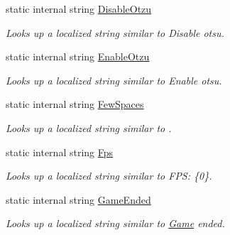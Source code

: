 \begin{DoxyCompactItemize}
static internal string \mbox{\hyperlink{class_chess_tracking_1_1_localization_1_1_program_localization_a1cf78f818c7e6499ec13270f42d75c0f}{Disable\+Otzu}}
\begin{DoxyCompactList}\small\item\em Looks up a localized string similar to Disable otsu. \end{DoxyCompactList}\item 
static internal string \mbox{\hyperlink{class_chess_tracking_1_1_localization_1_1_program_localization_a27f55e0053e8868dcd7c0e312cfb6003}{Enable\+Otzu}}
\begin{DoxyCompactList}\small\item\em Looks up a localized string similar to Enable otsu. \end{DoxyCompactList}\item 
static internal string \mbox{\hyperlink{class_chess_tracking_1_1_localization_1_1_program_localization_adfbd0d8334f47cf985747779e031db13}{Few\+Spaces}}
\begin{DoxyCompactList}\small\item\em Looks up a localized string similar to . \end{DoxyCompactList}\item 
static internal string \mbox{\hyperlink{class_chess_tracking_1_1_localization_1_1_program_localization_aee5a74e01e15fd81e9f4a9e2bf55d9b9}{Fps}}
\begin{DoxyCompactList}\small\item\em Looks up a localized string similar to F\+PS\+: \{0\}. \end{DoxyCompactList}\item 
static internal string \mbox{\hyperlink{class_chess_tracking_1_1_localization_1_1_program_localization_aaefb679cc9bf124b9e25fb438d7dca3c}{Game\+Ended}}
\begin{DoxyCompactList}\small\item\em Looks up a localized string similar to \mbox{\hyperlink{namespace_chess_tracking_1_1_game}{Game}} ended. \end{DoxyCompactList}\item 

\end{DoxyCompactItemize}
